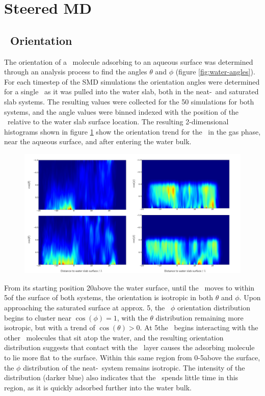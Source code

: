 \section{Steered MD}

\subsection {\suldiox~Orientation}

	The orientation of a \suldiox~molecule adsorbing to an aqueous surface was determined through an analysis process to find the angles $\theta$ and $\phi$ (figure \ref{fig:water-angles}). For each timestep of the SMD simulations the orientation angles were determined for a single \suldiox~as it was pulled into the water slab, both in the neat-\wat~and saturated slab systems. The resulting values were collected for the 50 simulations for both systems, and the angle values were binned indexed with the position of the \suldiox~relative to the water slab surface location. The resulting 2-dimensional histograms shown in figure \ref{fig:so2-transit-angles} show the orientation trend for the \suldiox~in the gas phase, near the aqueous surface, and after entering the water bulk.

\begin{figure}[h!]
	\begin{center}
		\includegraphics[scale=1.0]{images/so2transitorientationsmall.png}
		\caption{}
		\label{fig:so2-transit-angles}
	\end{center}
\end{figure}

	From its starting position 20\angs above the water surface, until the \suldiox~moves to within 5\angs of the surface of both systems, the orientation is isotropic in both $\theta$ and $\phi$. Upon approaching the saturated surface at approx. 5\angs, the \suldiox~$\phi$ orientation distribution begins to cluster near $\cos(\phi)=1$, with the $\theta$ distribution remaining more isotropic, but with a trend of $\cos(\theta)>0$. At 5\angs the \suldiox~begins interacting with the other \suldiox~molecules that sit atop the water, and the resulting orientation distribution suggests that contact with the \suldiox~layer causes the adsorbing molecule to lie more flat to the surface. Within this same region from 0-5\angs above the surface, the $\phi$ distribution of the neat-\wat~system remains isotropic. The intensity of the distribution (darker blue) also indicates that the \suldiox~spends little time in this region, as it is quickly adsorbed further into the water bulk.

